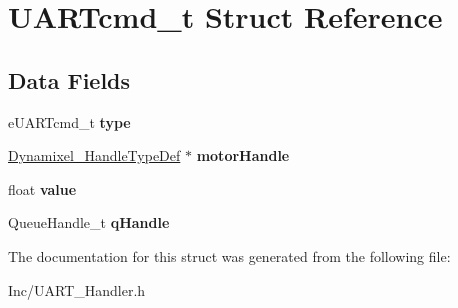 \hypertarget{struct_u_a_r_tcmd__t}{}\section{U\+A\+R\+Tcmd\+\_\+t Struct Reference}
\label{struct_u_a_r_tcmd__t}
\subsection*{Data Fields}
\begin{DoxyCompactItemize}
\item 
\mbox{\label{struct_u_a_r_tcmd__t_afe6b0f7af715a27f97b50b799e695dbc}} 
e\+U\+A\+R\+Tcmd\+\_\+t {\bfseries type}
\item 
\mbox{\label{struct_u_a_r_tcmd__t_ade6c3413bb42c2dd9ae09422289e533c}} 
\mbox{\hyperlink{struct_dynamixel___handle_type_def}{Dynamixel\+\_\+\+Handle\+Type\+Def}} $\ast$ {\bfseries motor\+Handle}
\item 
\mbox{\label{struct_u_a_r_tcmd__t_a17956fe0129d3d4c94ebc06cfef2ad82}} 
float {\bfseries value}
\item 
\mbox{\label{struct_u_a_r_tcmd__t_afad18aef473ee14c446a056b782bda6e}} 
Queue\+Handle\+\_\+t {\bfseries q\+Handle}
\end{DoxyCompactItemize}


The documentation for this struct was generated from the following file\+:\begin{DoxyCompactItemize}
\item 
Inc/U\+A\+R\+T\+\_\+\+Handler.\+h\end{DoxyCompactItemize}
